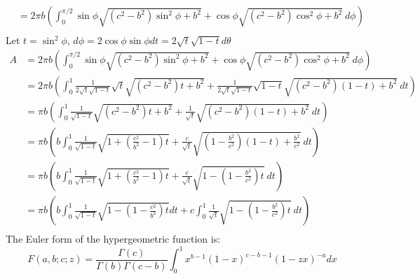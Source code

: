 \documentclass{X:/Documents/Coding/Latex/myassignment}
\begin{document}
\begin{enumerate}
\begin{enumerate}
\begin{align*}
		&= 2\pi b \left( \int_{0}^{\pi/2} \sin\phi\sqrt{(c^2-b^2)\sin^2\phi + b^2} + \cos\phi\sqrt{(c^2-b^2)\cos^2\phi + b^2} \ d\phi\right)\\
	\end{align*}
	Let $t = \sin^2\phi$, $d\phi = 2\cos\phi\sin\phi dt = 2\sqrt{t}\sqrt{1-t} d\theta$
\begin{align*}
		A &= 2\pi b \left( \int_{0}^{\pi/2} \sin\phi\sqrt{(c^2-b^2)\sin^2\phi + b^2} + \cos\phi\sqrt{(c^2-b^2)\cos^2\phi + b^2} \ d\phi\right)\\
		&= 2\pi b \left( \int_{0}^{1} \frac{1}{2\sqrt{t}\sqrt{1-t}}\sqrt{t}\sqrt{(c^2-b^2)t + b^2} +  \frac{1}{2\sqrt{t}\sqrt{1-t}}\sqrt{1-t}\sqrt{(c^2-b^2)(1-t) + b^2} \ dt\right)\\
		&= \pi b \left( \int_{0}^{1} \frac{1}{\sqrt{1-t}}\sqrt{(c^2-b^2)t + b^2} +  \frac{1}{\sqrt{t}}\sqrt{(c^2-b^2)(1-t) + b^2} \ dt\right)\\
		&= \pi b \left( b\int_{0}^{1} \frac{1}{\sqrt{1-t}}\sqrt{1 + (\frac{c^2}{b^2}-1)t} +  \frac{c}{\sqrt{t}}\sqrt{(1-\frac{b^2}{c^2})(1-t) + \frac{b^2}{c^2}} \ dt\right)\\
		&= \pi b \left( b\int_{0}^{1} \frac{1}{\sqrt{1-t}}\sqrt{1 + (\frac{c^2}{b^2}-1)t} +  \frac{c}{\sqrt{t}}\sqrt{1 - (1-\frac{b^2}{c^2})t}\ dt\right)\\
		&= \pi b \left( b\int_{0}^{1} \frac{1}{\sqrt{1-t}}\sqrt{1 - (1-\frac{c^2}{b^2})t}dt +  c \int_0^1\frac{1}{\sqrt{t}}\sqrt{1 - (1-\frac{b^2}{c^2})t} \ dt\right)\\
\end{align*}
	The Euler form of the hypergeometric function is:
	\[F(a,b;c;z) = \frac{\Gamma(c)}{\Gamma(b)\Gamma(c-b)}\int_0^1 x^{b-1} (1-x)^{c-b-1} (1- zx)^{-a} dx\]


\end{enumerate}
\end{enumerate}
\end{document}
